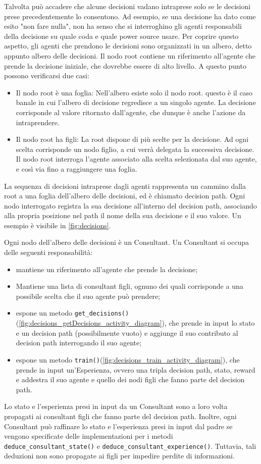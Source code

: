 \documentclass[conference]{IEEEtran}
\newcommand{\code}[1]{\texttt{#1}}
\begin{document}
Talvolta può accadere che alcune decisioni vadano intraprese solo se le decisioni prese
precedentemente lo consentono. Ad esempio, se una decisione ha dato come esito
"non fare nulla", non ha senso che si interroghino gli agenti responsabili
della decisione su quale coda e quale power source usare. Per coprire questo aspetto,
gli agenti che prendono le decisioni sono organizzati in un albero, detto appunto
albero delle decisioni. Il nodo root contiene un riferimento all'agente che prende
la decisione iniziale, che dovrebbe essere di alto livello.
A questo punto possono verificarsi due casi:
\begin{itemize}
    \item Il nodo root è una foglia: Nell'albero esiste solo il nodo root. questo
    è il caso banale in cui l'albero di decisione regredisce a un singolo agente.
    La decisione corrisponde al valore ritornato dall'agente, che dunque è anche
    l'azione da intraprendere.
    \item Il nodo root ha figli: La root dispone di più scelte per la decisione.
    Ad ogni scelta corrisponde un nodo figlio, a cui verrà delegata la successiva
    decisione. Il nodo root interroga l'agente associato alla scelta selezionata
    dal suo agente, e così via fino a raggiungere una foglia.
\end{itemize}
La sequenza di decisioni
intraprese dagli agenti rappresenta un cammino dalla root a una foglia dell'albero
delle decisioni, ed è chiamato decision path.
Ogni nodo interrogato registra la sua decisione all'interno del decision path, 
associando alla propria posizione nel path il nome della sua decisione e il suo
valore. Un esempio è visibile in \autoref{fig:decisions}.

Ogni nodo dell'albero delle decisioni è un Consultant. Un Consultant si occupa
delle seguenti responsabilità:
\begin{itemize}
    \item mantiene un riferimento all'agente che prende la decisione;
    \item Mantiene una lista di consultant figli, ognuno dei quali corrisponde
    a una possibile scelta che il suo agente può prendere;
    \item espone un metodo \code{get\_decisions()}(\autoref{fig:decisions_getDecisions_activity_diagram}), che prende in input
    lo stato e un decision path (possibilmente vuoto) e aggiunge il suo contributo
    al decision path interrogando il suo agente;
    \item espone un metodo \code{train()}(\autoref{fig:decisions_train_activity_diagram}), che prende in input un'Esperienza,
    ovvero una tripla
    decision path, stato, reward e addestra il suo agente e quello dei nodi
    figli che fanno parte del decision path.
\end{itemize}
Lo stato e l'esperienza presi in input da un Consultant sono a loro volta
propagati ai consultant figli che fanno parte del decision path. Inoltre,
ogni Consultant può raffinare lo stato e l'esperienza presi in input dal padre
se vengono specificate delle implementazioni per i metodi \code{deduce\_consultant\_state()}
e \code{deduce\_consultant\_experience()}. Tuttavia, tali deduzioni non sono propagate ai figli
per impedire perdite di informazioni. 
\end{document}
